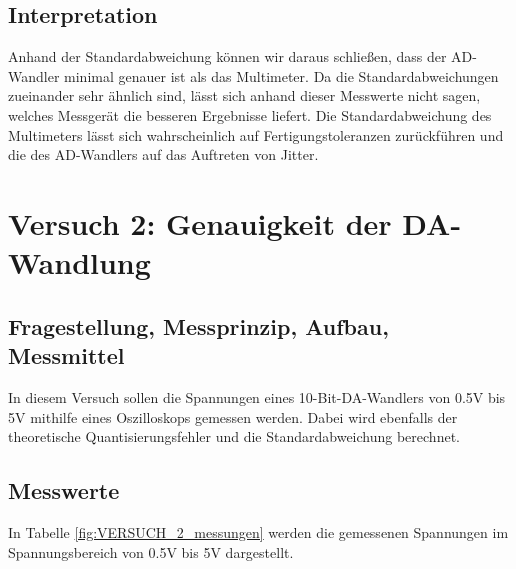 \documentclass[12pt, oneside, a4paper, \docLanguage]{report}
\begin{document}
\section{Interpretation}
\label{chap:VERSUCH_1_INTERPRETATION}
Anhand der Standardabweichung können wir daraus schließen, dass der AD-Wandler minimal genauer ist als das Multimeter. Da die Standardabweichungen zueinander sehr ähnlich sind, lässt sich anhand dieser Messwerte nicht sagen, welches Messgerät die besseren Ergebnisse liefert. 
Die Standardabweichung des Multimeters lässt sich wahrscheinlich auf Fertigungstoleranzen zurückführen und die des AD-Wandlers auf das Auftreten von Jitter.

%
%
\chapter{Versuch 2: Genauigkeit der DA-Wandlung}
\label{chap:VERSUCH_2}

\section{Fragestellung, Messprinzip, Aufbau, Messmittel}
\label{chap:VERSUCH_2_FRAGESTELLUNG}
In diesem Versuch sollen die Spannungen eines 10-Bit-DA-Wandlers von 0.5V bis 5V mithilfe eines Oszilloskops gemessen werden. Dabei wird ebenfalls der theoretische Quantisierungsfehler und die Standardabweichung berechnet.
\newpage
\section{Messwerte}
\label{chap:VERSUCH_2_MESSWERTE}
In Tabelle \ref{fig:VERSUCH_2_messungen} werden die gemessenen Spannungen im Spannungsbereich von 0.5V bis 5V dargestellt.
\end{document}
